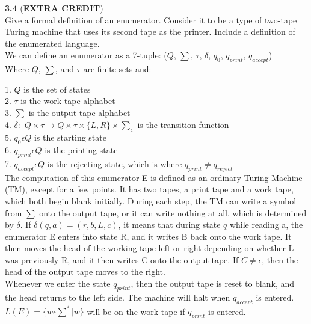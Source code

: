 \documentclass[12pt]{article}
\begin{document}
\pagebreak
\textbf{3.4} (\textbf{EXTRA CREDIT}) \\
Give a formal definition of an enumerator. Consider it to be a type of two-tape
Turing machine that uses its second tape as the printer. Include a definition
of the enumerated language. \\

We can define an enumerator as a 7-tuple:
($Q$, $\sum$, $\tau$, $\delta$, $q_0$, $q_{print}$, $q_{accept}$) \\

Where $Q$, $\sum$, and $\tau$ are finite sets and:

1. $Q$ is the set of states \\
2. $\tau$ is the work tape alphabet \\
3. $\sum$ is the output tape alphabet \\
4. $\delta:$ $Q \times \tau \rightarrow Q \times \tau \times \{L, R\} \times \sum_{\epsilon}$
is the transition function \\
5. $q_0 \epsilon Q$ is the starting state \\
6. $q_{print} \epsilon Q$ is the printing state \\
7. $q_{accept} \epsilon Q$ is the rejecting state, which is where $q_{print} \ne q_{reject}$ \\

The computation of this enumerator E is defined as an ordinary Turing Machine (TM),
except for a few points. It has two tapes, a print tape and a work tape, which
both begin blank initially. During each step, the TM can write a symbol from $\sum$
onto the output tape, or it can write nothing at all, which is determined by $\delta$.
If $\delta (q, a) = (r, b, L, c)$, it means that during state $q$ while reading a,
the enumerator E enters into state R, and it writes B back onto the work tape. It
then moves the head of the working tape left or right depending on whether L was
previously R, and it then writes C onto the output tape. If $C \ne \epsilon$, then
the head of the output tape moves to the right. \\

Whenever we enter the state $q_{print}$, then the output tape is reset to blank,
and the head returns to the left side. The machine will halt when $q_{accept}$ is
entered. $L(E) = \{w \epsilon \sum^* | w \}$ will be on the work tape if $q_{print}$
is entered. \\
\end{document}
